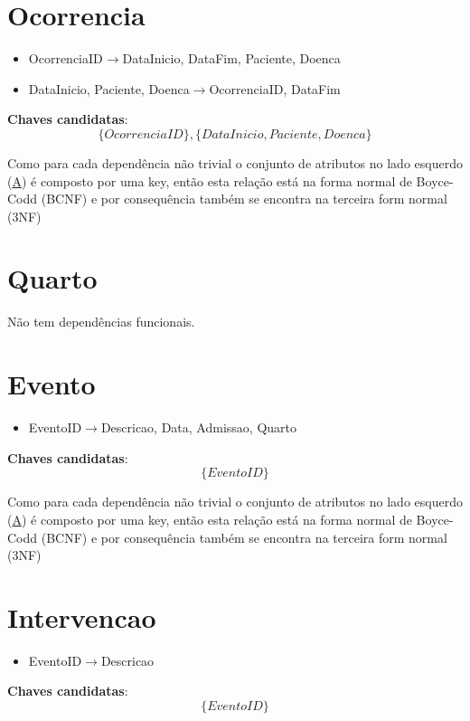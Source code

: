 \documentclass[article, a4paper, 12pt, oneside]{memoir}
\begin{document}
\section*{Ocorrencia}
\begin{itemize}
	\item OcorrenciaID$\rightarrow$DataInicio, DataFim, Paciente, Doenca
	\item DataInicio, Paciente, Doenca$\rightarrow$OcorrenciaID, DataFim
\end{itemize}

\textbf{Chaves candidatas}:\\
\[
\{ OcorrenciaID \}, \{ DataInicio, Paciente, Doenca \}
\]

Como para cada dependência não trivial o conjunto de atributos no lado esquerdo (\underline{A}) é composto por uma key, então esta relação está na forma normal de Boyce-Codd (BCNF) e por consequência também se encontra na terceira form normal (3NF)

\section*{Quarto}
Não tem dependências funcionais.

\section*{Evento}
\begin{itemize}
	\item EventoID$\rightarrow$Descricao, Data, Admissao, Quarto
\end{itemize}

\textbf{Chaves candidatas}:\\
\[
\{ EventoID \}
\]

Como para cada dependência não trivial o conjunto de atributos no lado esquerdo (\underline{A}) é composto por uma key, então esta relação está na forma normal de Boyce-Codd (BCNF) e por consequência também se encontra na terceira form normal (3NF)


\section*{Intervencao}
\begin{itemize}
	\item EventoID$\rightarrow$Descricao
\end{itemize}

\textbf{Chaves candidatas}:\\
\[
\{ EventoID \}
\]
\end{document}
